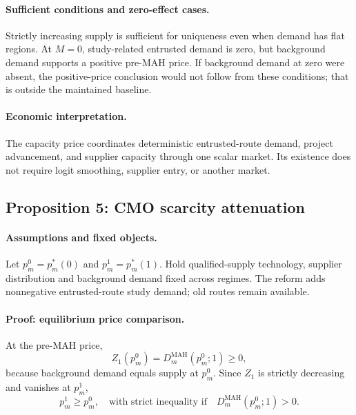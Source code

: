\paragraph{Sufficient conditions and zero-effect cases.}
Strictly increasing supply is sufficient for uniqueness even when demand has
flat regions. At \(M=0\), study-related entrusted demand is zero, but
background demand supports a positive pre-MAH price. If background demand at
zero were absent, the positive-price conclusion would not follow from these
conditions; that is outside the maintained baseline.

\paragraph{Economic interpretation.}
The capacity price coordinates deterministic entrusted-route demand,
project advancement, and supplier capacity through one scalar market. Its
existence does not require logit smoothing, supplier entry, or another market.

\subsection{Proposition 5: CMO scarcity attenuation}
\label{prop:p08-scarcity}

\paragraph{Assumptions and fixed objects.}
Let \(p_m^0=p_m^*(0)\) and \(p_m^1=p_m^*(1)\). Hold qualified-supply
technology, supplier distribution and background demand fixed across regimes.
The reform adds nonnegative entrusted-route study demand; old routes remain
available.

\paragraph{Proof: equilibrium price comparison.}
At the pre-MAH price,
\[
  Z_1(p_m^0)
  =
  D_m^{\mathrm{MAH}}(p_m^0;1)
  \geq0,
\]
because background demand equals supply at \(p_m^0\). Since \(Z_1\) is
strictly decreasing and vanishes at \(p_m^1\),
\begin{equation}
  p_m^1\geq p_m^0,
  \quad\text{with strict inequality if}\quad
  D_m^{\mathrm{MAH}}(p_m^0;1)>0.
  \label{eq:p08-price-order}
\end{equation}

